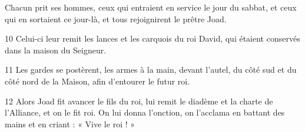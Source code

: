 
Chacun prit ses hommes, ceux qui entraient en service le jour du sabbat, et ceux qui en sortaient ce jour-là, et tous rejoignirent le prêtre Joad.

10 Celui-ci leur remit les lances et les carquois du roi David, qui étaient conservés dans la maison du Seigneur.

11 Les gardes se postèrent, les armes à la main, devant l’autel, du côté sud et du côté nord de la Maison, afin d’entourer le futur roi.

12 Alors Joad fit avancer le fils du roi, lui remit le diadème et la charte de l’Alliance, et on le fit roi. On lui donna l’onction, on l’acclama en battant des mains et en criant : « Vive le roi ! »